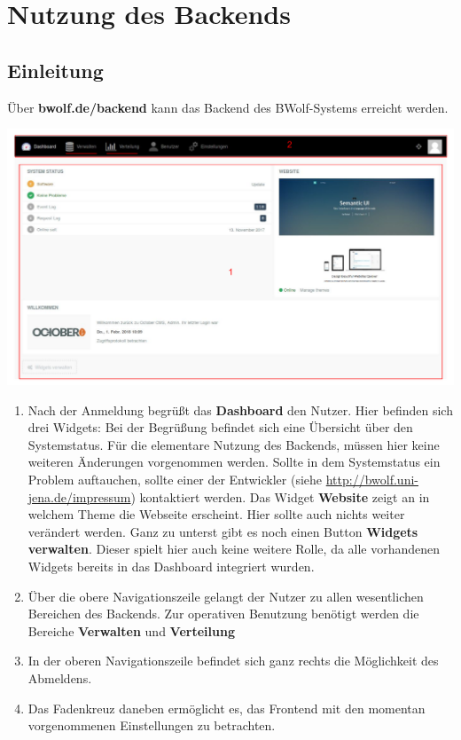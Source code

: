 \chapter{Nutzung des Backends}
\label{chapter:use}
  
  \section{Einleitung}
  \label{section:backend_introduction}
  
  Über \textbf{bwolf.de/backend} kann das Backend des BWolf-Systems erreicht werden.
  
  \includegraphics[scale=0.3]{backend/img/dashboard.pdf}
  \begin{enumerate}
   \item Nach der Anmeldung begrüßt das \textbf{Dashboard} den Nutzer. 
	  Hier befinden sich drei Widgets:\newline
	  Bei der Begrüßung befindet sich eine Übersicht über den Systemstatus.\newline
	  Für die elementare Nutzung des Backends, müssen hier keine weiteren Änderungen vorgenommen werden.\newline
	  Sollte in dem Systemstatus ein Problem auftauchen, sollte einer der Entwickler (siehe \url{http://bwolf.uni-jena.de/impressum}) 
	  kontaktiert werden.\newline
	  Das Widget \textbf{Website} zeigt an in welchem Theme die Webseite erscheint. Hier sollte auch nichts weiter verändert werden.
	  Ganz zu unterst gibt es noch einen Button \textbf{Widgets verwalten}. 
	  Dieser spielt hier auch keine weitere Rolle, da alle vorhandenen Widgets bereits in das Dashboard integriert wurden.
   \item Über die obere Navigationszeile gelangt der Nutzer zu allen wesentlichen Bereichen des Backends.
	 Zur operativen Benutzung benötigt werden die Bereiche \textbf{Verwalten} und \textbf{Verteilung}
   \item[] In der oberen Navigationszeile befindet sich ganz rechts die Möglichkeit des Abmeldens.
   \item[] Das Fadenkreuz daneben ermöglicht es, das Frontend mit den momentan vorgenommenen Einstellungen zu betrachten.
  \end{enumerate}


